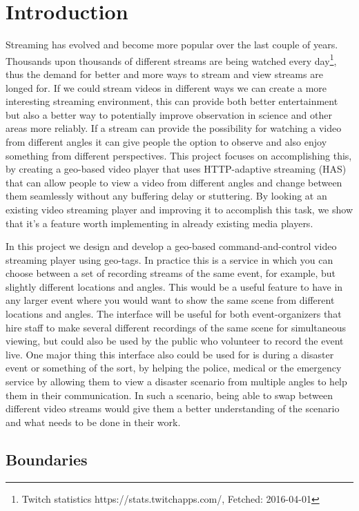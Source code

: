 \chapter{Introduction}
\label{cha:introduction}

Streaming has evolved and become more popular over the last couple of years. Thousands upon thousands of different streams are being watched every day\footnote{Twitch statistics https://stats.twitchapps.com/, Fetched: 2016-04-01}, thus the demand for better and more ways to stream and view streams are longed for. If we could stream videos in different ways we can create a more interesting streaming environment, this can provide both better entertainment but also a better way to potentially improve observation in science and other areas more reliably. If a stream can provide the possibility for watching a video from different angles it can give people the option to observe and also enjoy something from different perspectives. This project focuses on accomplishing this, by creating a geo-based video player that uses HTTP-adaptive streaming (HAS) that can allow people to view a video from different angles and change between them seamlessly without any buffering delay or stuttering. By looking at an existing video streaming player and improving it to accomplish this task, we show that it's a feature worth implementing in already existing media players.

In this project we design and develop a geo-based command-and-control video streaming player using geo-tags. In practice this is a service in which you can choose between a set of recording streams of the same event, for example, but slightly different locations and angles. This would be a useful feature to have in any larger event where you would want to show the same scene from different locations and angles. The interface will be useful for both event-organizers that hire staff to make several different recordings of the same scene for simultaneous viewing, but could also be used by the public who volunteer to record the event live. One major thing this interface also could be used for is during a disaster event or something of the sort, by helping the police, medical or the emergency service by allowing them to view a disaster scenario from multiple angles to help them in their communication. In such a scenario, being able to swap between different video streams would give them a better understanding of the scenario and what needs to be done in their work.

\section{Boundaries}
\label{sec:boundaries}

